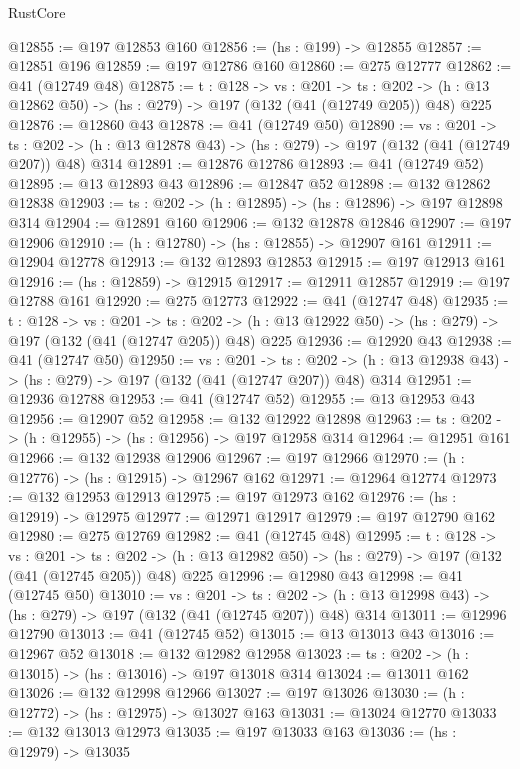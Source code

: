 \begin{lexlean}{RustCore}
\begin{coremodule}
@12855 := @197 @12853 @160
@12856 := (hs : @199) -> @12855
@12857 := @12851 @196
@12859 := @197 @12786 @160
@12860 := @275 @12777
@12862 := @41 (@12749 @48)
@12875 := {t : @128} ->
  {vs : @201} ->
  {ts : @202} -> (h : @13 @12862 @50) -> (hs : @279) -> @197 (@132 (@41 (@12749 @205)) @48) @225
@12876 := @12860 @43
@12878 := @41 (@12749 @50)
@12890 := {vs : @201} ->
  {ts : @202} -> (h : @13 @12878 @43) -> (hs : @279) -> @197 (@132 (@41 (@12749 @207)) @48) @314
@12891 := @12876 @12786
@12893 := @41 (@12749 @52)
@12895 := @13 @12893 @43
@12896 := @12847 @52
@12898 := @132 @12862 @12838
@12903 := {ts : @202} -> (h : @12895) -> (hs : @12896) -> @197 @12898 @314
@12904 := @12891 @160
@12906 := @132 @12878 @12846
@12907 := @197 @12906
@12910 := (h : @12780) -> (hs : @12855) -> @12907 @161
@12911 := @12904 @12778
@12913 := @132 @12893 @12853
@12915 := @197 @12913 @161
@12916 := (hs : @12859) -> @12915
@12917 := @12911 @12857
@12919 := @197 @12788 @161
@12920 := @275 @12773
@12922 := @41 (@12747 @48)
@12935 := {t : @128} ->
  {vs : @201} ->
  {ts : @202} -> (h : @13 @12922 @50) -> (hs : @279) -> @197 (@132 (@41 (@12747 @205)) @48) @225
@12936 := @12920 @43
@12938 := @41 (@12747 @50)
@12950 := {vs : @201} ->
  {ts : @202} -> (h : @13 @12938 @43) -> (hs : @279) -> @197 (@132 (@41 (@12747 @207)) @48) @314
@12951 := @12936 @12788
@12953 := @41 (@12747 @52)
@12955 := @13 @12953 @43
@12956 := @12907 @52
@12958 := @132 @12922 @12898
@12963 := {ts : @202} -> (h : @12955) -> (hs : @12956) -> @197 @12958 @314
@12964 := @12951 @161
@12966 := @132 @12938 @12906
@12967 := @197 @12966
@12970 := (h : @12776) -> (hs : @12915) -> @12967 @162
@12971 := @12964 @12774
@12973 := @132 @12953 @12913
@12975 := @197 @12973 @162
@12976 := (hs : @12919) -> @12975
@12977 := @12971 @12917
@12979 := @197 @12790 @162
@12980 := @275 @12769
@12982 := @41 (@12745 @48)
@12995 := {t : @128} ->
  {vs : @201} ->
  {ts : @202} -> (h : @13 @12982 @50) -> (hs : @279) -> @197 (@132 (@41 (@12745 @205)) @48) @225
@12996 := @12980 @43
@12998 := @41 (@12745 @50)
@13010 := {vs : @201} ->
  {ts : @202} -> (h : @13 @12998 @43) -> (hs : @279) -> @197 (@132 (@41 (@12745 @207)) @48) @314
@13011 := @12996 @12790
@13013 := @41 (@12745 @52)
@13015 := @13 @13013 @43
@13016 := @12967 @52
@13018 := @132 @12982 @12958
@13023 := {ts : @202} -> (h : @13015) -> (hs : @13016) -> @197 @13018 @314
@13024 := @13011 @162
@13026 := @132 @12998 @12966
@13027 := @197 @13026
@13030 := (h : @12772) -> (hs : @12975) -> @13027 @163
@13031 := @13024 @12770
@13033 := @132 @13013 @12973
@13035 := @197 @13033 @163
@13036 := (hs : @12979) -> @13035

\end{coremodule}
\end{lexlean}
